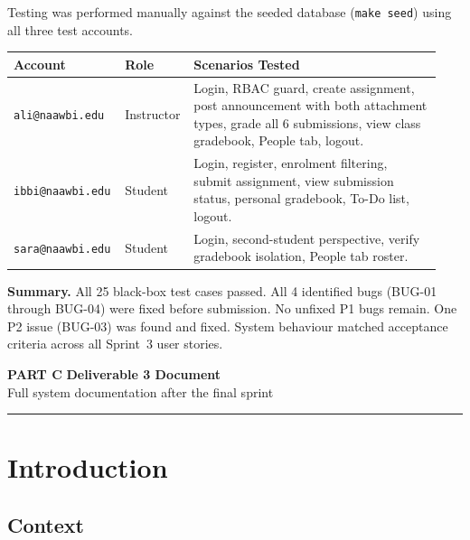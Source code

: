 \documentclass[12pt, a4paper]{article}
\newcommand{\fcolplain}[1]{\textbf{#1}}
\begin{document}
Testing was performed manually against the seeded database (\texttt{make seed})
using all three test accounts.

\begin{center}
\small\begin{tabular}{@{}p{0.24\linewidth}p{0.12\linewidth}p{0.58\linewidth}@{}}
  \toprule
  \fcolplain{Account} & Role       & Scenarios Tested \\
  \midrule
  \texttt{ali@naawbi.edu}  & Instructor & Login, RBAC guard, create assignment, post announcement with both attachment types, grade all 6 submissions, view class gradebook, People tab, logout. \\
  \texttt{ibbi@naawbi.edu} & Student    & Login, register, enrolment filtering, submit assignment, view submission status, personal gradebook, To-Do list, logout. \\
  \texttt{sara@naawbi.edu} & Student    & Login, second-student perspective, verify gradebook isolation, People tab roster. \\
  \bottomrule
\end{tabular}
\end{center}

\noindent\textbf{Summary.} All 25 black-box test cases passed. All 4 identified
bugs (BUG-01 through BUG-04) were fixed before submission. No unfixed P1 bugs
remain. One P2 issue (BUG-03) was found and fixed. System behaviour matched
acceptance criteria across all Sprint~3 user stories.

\newpage
\begin{center}
  {\LARGE\bfseries\color{primary} PART C\,\textemdash\,Deliverable 3 Document}\\[4pt]
  {\color{muted}\small Full system documentation after the final sprint}\\[4pt]
  {\color{rule!40}\rule{7cm}{0.6pt}}
\end{center}

\section{Introduction}

\subsection{Context}
\end{document}
